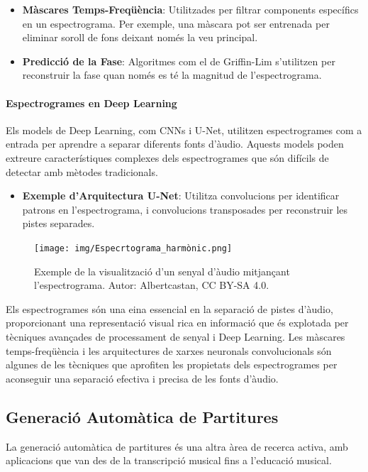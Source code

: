 \documentclass[10pt,a4paper,twocolumn,twoside]{article}
\begin{document}
\begin{itemize}
    \item \textbf{Màscares Temps-Freqüència}: Utilitzades per filtrar components específics en un espectrograma. Per exemple, una màscara pot ser entrenada per eliminar soroll de fons deixant només la veu principal.
    \item \textbf{Predicció de la Fase}: Algoritmes com el de Griffin-Lim s'utilitzen per reconstruir la fase quan només es té la magnitud de l'espectrograma.
\end{itemize}

\paragraph{Espectrogrames en Deep Learning}
Els models de Deep Learning, com CNNs i U-Net, utilitzen espectrogrames com a entrada per aprendre a separar diferents fonts d'àudio. Aquests models poden extreure característiques complexes dels espectrogrames que són difícils de detectar amb mètodes tradicionals.

\begin{itemize}
    \item \textbf{Exemple d'Arquitectura U-Net}: Utilitza convolucions per identificar patrons en l'espectrograma, i convolucions transposades per reconstruir les pistes separades.
\end{itemize}

\begin{figure}[h]
    \centering
    \texttt{[image: img/Especrtograma\_harmònic.png]}
    \caption{Exemple de la visualització d'un senyal d'àudio mitjançant l'espectrograma. Autor: Albertcastan, CC BY-SA 4.0.}
    \label{fig:espectrograma-harmonic}
\end{figure}

Els espectrogrames són una eina essencial en la separació de pistes d'àudio, proporcionant una representació visual rica en informació que és explotada per tècniques avançades de processament de senyal i Deep Learning. Les màscares temps-freqüència i les arquitectures de xarxes neuronals convolucionals són algunes de les tècniques que aprofiten les propietats dels espectrogrames per aconseguir una separació efectiva i precisa de les fonts d'àudio.


\subsection{Generació Automàtica de Partitures}
La generació automàtica de partitures és una altra àrea de recerca activa, amb aplicacions que van des de la transcripció musical fins a l'educació musical.
\end{document}
